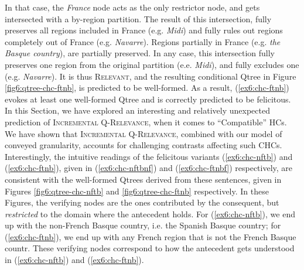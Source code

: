 In that case, the \textit{France} node acts as the only restrictor node, and gets intersected with a by-region partition. The result of this intersection, fully preserves all regions included in France (e.g. \textit{Midi}) and fully rules out regions completely out of France (e.g. \textit{Navarre}). Regions partially in France (e.g. \textit{the Basque country}), are partially preserved. In any case, this intersection fully preserves one region from the original partition (e.e. \textit{Midi}), and fully excludes one (e.g. \textit{Navarre}). It is thus \textsc{Relevant}, and the resulting conditional Qtree in Figure \ref{fig6:qtree-chc-ftnb}, is predicted to be well-formed. As a result, (\ref{ex6:chc-ftnb}) evokes at least one well-formed Qtree and is correctly predicted to be felicitous.\\

In this Section, we have explored an interesting and relatively unexpected prediction of \textsc{Incremental Q-Relevance}, when it comes to ``Compatible'' HCs. We have shown that \textsc{Incremental Q-Relevance}, combined with our model of conveyed granularity, accounts for challenging contrasts affecting such CHCs. Interestingly, the intuitive readings of the felicitous variants   (\ref{ex6:chc-nftb}) and (\ref{ex6:chc-ftnb}), given in (\ref{ex6:chc-nftbnf}) and (\ref{ex6:chc-ftnbf}) respectively, are consistent with the well-formed Qtrees derived from these sentences, given in Figures \ref{fig6:qtree-chc-nftb} and \ref{fig6:qtree-chc-ftnb} respectively. In these Figures, the verifying nodes are the ones contributed by the consequent, but \textit{restricted} to the domain where the antecedent holds. For (\ref{ex6:chc-nftb}), we end up with the non-French Basque country, i.e. the Spanish Basque country; for (\ref{ex6:chc-ftnb}), we end up with any French region that is not the French Basque countr. These verifying nodes correspond to how the antecedent gets understood in (\ref{ex6:chc-nftb}) and (\ref{ex6:chc-ftnb}).

